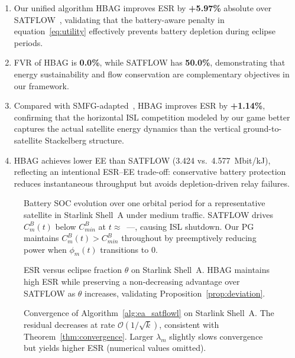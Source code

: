 \documentclass[journal]{IEEEtran}
\newcommand{\CB}{C^{B}}
\newcommand{\CBmin}{C^{B}_{min}}
\begin{document}
\begin{enumerate}
    \item Our unified algorithm HBAG improves ESR by
    \textbf{+5.97\%} absolute over
SATFLOW~\cite{cen2024satflow}, validating that the battery-aware penalty in equation~\eqref{eq:utility} effectively prevents battery depletion during eclipse periods.

    \item FVR of HBAG is \textbf{0.0\%}, while SATFLOW has \textbf{50.0\%}, demonstrating that energy sustainability and flow conservation are complementary objectives in our framework.

    \item Compared with
SMFG-adapted~\cite{wang2023smfg}, HBAG improves ESR by \textbf{+1.14\%}, confirming that the horizontal ISL competition modeled by our game better captures the actual satellite energy dynamics than the vertical ground-to-satellite Stackelberg structure.

    \item HBAG achieves lower EE than SATFLOW (3.424 vs.\ 4.577~Mbit/kJ), reflecting an intentional ESR--EE trade-off: conservative battery protection reduces instantaneous throughput but avoids depletion-driven relay failures.
\end{enumerate}

\begin{figure}[t]
\centering
\caption{Battery SOC evolution over one orbital
period for a representative satellite in
Starlink Shell~A under medium traffic.
SATFLOW drives $\CB_m(t)$ below $\CBmin$ at
$t\approx$~---, causing ISL shutdown.
Our PG maintains $\CB_m(t)>\CBmin$ throughout by
preemptively reducing power when $\phi_m(t)$
transitions to 0.}
\label{fig:soc}
\end{figure}

\begin{figure}[t]
\centering
\caption{ESR versus eclipse fraction $\theta$ on
Starlink Shell~A. HBAG maintains high ESR
while preserving a non-decreasing advantage over SATFLOW as $\theta$ increases, validating
Proposition~\ref{prop:deviation}.}
\label{fig:esr_theta}
\end{figure}

\begin{figure}[t]
\centering
\caption{Convergence of Algorithm~\ref{alg:ea_satflowl}
on Starlink Shell~A. The residual decreases at rate
$\mathcal{O}(1/\sqrt{k})$, consistent with
Theorem~\ref{thm:convergence}. Larger $\lambda_m$
slightly slows convergence but yields higher ESR (numerical values omitted).}
\label{fig:convergence}
\end{figure}
\end{document}
